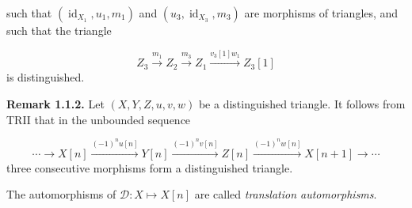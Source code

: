 such that $(\operatorname{id}_{X_1},u_1,m_1)$ and
$(u_3,\operatorname{id}_{X_3},m_3)$ are morphisms of triangles, and such
that the triangle

\[
  Z_3\xrightarrow{m_1}Z_2\xrightarrow{m_3}Z_1
  \xrightarrow{v_3[1]w_1}Z_3[1]
\]
is distinguished.

\medskip
\noindent\textbf{Remark 1.1.2.}\quad
Let $(X,Y,Z,u,v,w)$ be a distinguished triangle. It follows from TRII that
in the unbounded sequence

\[
  \cdots\longrightarrow X[n]
  \xrightarrow{(-1)^n u[n]}Y[n]
  \xrightarrow{(-1)^n v[n]}Z[n]
  \xrightarrow{(-1)^n w[n]}X[n+1]
  \longrightarrow\cdots
\]
three consecutive morphisms form a distinguished triangle.

The automorphisms of $\mathcal D\colon X\longmapsto X[n]$ are called
\emph{translation automorphisms}.
\endgroup
